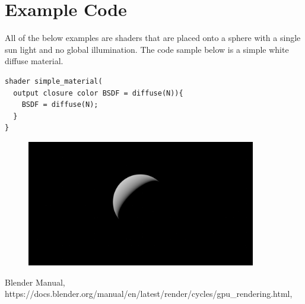\documentclass{article}
\begin{document}
\section{Example Code}
All of the below examples are shaders that are placed onto a sphere with a single sun light and no global illumination. The code sample below is a simple white diffuse material.
\begin{lstlisting}
shader simple_material(
  output closure color BSDF = diffuse(N)){
    BSDF = diffuse(N);
  }
}
\end{lstlisting}
\begin{figure}
\includegraphics[width=10cm]{hello_sphere.png}
\centering
\end{figure}

\begin{thebibliography}{9}

  Blender Manual,
  https://docs.blender.org/manual/en/latest/render/cycles/gpu\_rendering.html,

\end{thebibliography}
\end{document}
